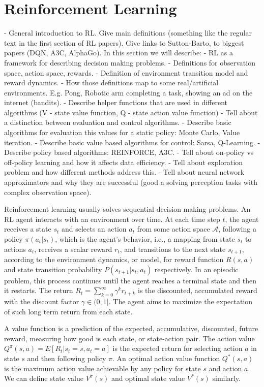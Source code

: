 \section{Reinforcement Learning}

- General introduction to RL. Give main definitions (something like the
regular text in the first section of RL papers). Give links to
Sutton-Barto, to biggest papers (DQN, A3C, AlphaGo).
In this section we will describe:
- RL as a framework for describing decision making problems.
- Definitions for observation space, action space, rewards.
- Definition of environment transition model and reward dynamics.
- How those definitions map to some real/artificial environments. E.g. Pong, Robotic arm completing a task,
showing an ad on the internet (bandits).
- Describe helper functions that are used in different algorithms (V - state value function, Q - state action value function)
- Tell about a distinction between evaluation and control algorithms.
- Describe basic algorithms for evaluation this values for a static policy: Monte Carlo, Value iteration.
- Describe basic value based algorithms for control: Sarsa, Q-Learning.
- Describe policy based algorithms: REINFORCE, A3C.
- Tell about on-policy vs off-policy learning and how it affects data efficiency.
- Tell about exploration problem and how different methods address this.
- Tell about neural network approximators and why they are successful (good a solving perception tasks with complex
observation space).

Reinforcement learning usually solves sequential decision making problems. An RL agent interacts with an environment over time. At each time step $t$, the agent receives a state $s_t$ and selects an action $a_t$ from some action space $\mathcal{A}$, following a policy $\pi(a_t|s_t)$, which is the agent's behavior, i.e., a mapping from state $s_t$ to actions $a_t$, receives a scalar reward $r_t$, and transitions to the next state $s_{t+1}$, according to the environment dynamics, or model, for reward function $R(s,a)$ and state transition probability $P(s_{t+1}|s_t, a_t)$ respectively. In an episodic problem, this process continues until the agent reaches a terminal state and then it restarts. The return $R_t = \sum_{k=0}^{\infty} \gamma^k r_{t+k}$ is the discounted, accumulated reward with the discount factor $\gamma \in (0,1]$. The agent aims to maximize the expectation of such long term return from each state.

A value function is a prediction of the expected, accumulative, discounted, future reward, measuring how good is each state, or state-action pair. The action value $Q^{\pi}(s, a) = E[R_t | s_t = s, a_t = a]$ is the expected return for selecting action $a$ in state $s$ and then following policy $\pi$. An optimal action value function $Q^{*}(s, a)$ is the maximum action value achievable by any policy for state $s$ and action $a$. We can define state value $V^{\pi}(s)$ and optimal state value $V^{*}(s)$ similarly.

